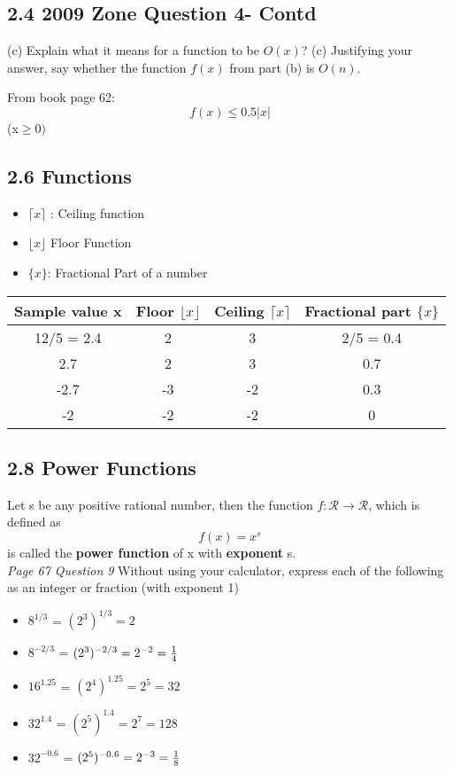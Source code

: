 \documentclass[12 pt]{article}
\begin{document}
\subsection*{2.4 2009 Zone Question 4- Contd }

(c) Explain what it means for a function to be $O(x)$?
(c) Justifying your answer, say whether the function $
f(x)$ from part (b) is $O(n)$.

From book page 62:
\[ f(x) \leq 0.5 |x|\] (x$\geq 0)$
\newpage



\subsection*{2.6 Functions}
\begin{itemize}
\item $\lceil x\rceil$ : Ceiling function
\item $\lfloor x\rfloor$ Floor Function
\item $\{x\}$: Fractional Part of a number
\end{itemize}

\begin{tabular}{|c|c|c|c|} \hline
Sample value x & Floor $\lfloor x\rfloor$ & Ceiling  $\lceil x\rceil$ & Fractional part $ \{ x \} $\\ \hline
12/5 = 2.4 &	2	&3&	2/5 = 0.4\\
2.7&	2&	3	&0.7\\
-2.7&	-3&	-2	&0.3\\
-2&	-2&	-2	&0\\\hline
\end{tabular} 



\newpage
\subsection*{2.8 Power Functions}
Let s be any positive rational number, then the function $f: \mathcal{R} \rightarrow \mathcal{R}$, which is defined
as \[ f(x) = x^s\] is called the \textbf{power function} of x with \textbf{exponent} s.\\

\bigskip 
\noindent \emph{Page 67 Question 9}
Without using your calculator, express each of the following as an integer or fraction (with exponent 1)
\begin{itemize}
\item $8^{1/3}$ = $(2^3)^{1/3} = 2$
\item $8^{-2/3}$ = $(2^3)^{-2/3} = 2^{-2} = {1 \over 4}$
\item $16^{1.25}$ = $(2^4)^{1.25}  = 2^5 = 32$ 
\item $32^{1.4}$ = $(2^5)^{1.4} = 2^7 = 128$
\item $32^{-0.6}$ = $(2^5)^{-0.6} = 2^{-3} =  {1 \over 8}$
\end{itemize}
\end{document}
